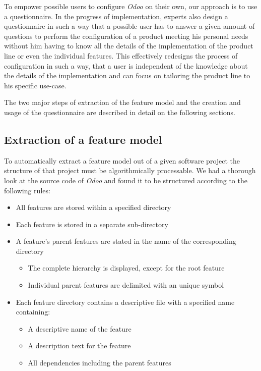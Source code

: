 To empower possible users to configure \textit{Odoo} on their own, our approach is to use a questionnaire. In the progress of implementation, experts also design a questionnaire in such a way that a possible user has to answer a given amount of questions to perform the configuration of a product meeting his personal needs without him having to know all the details of the implementation of the product line or even the individual features. This effectively redesigns the process of configuration in such a way, that a user is independent of the knowledge about the details of the implementation and can focus on tailoring the product line to his specific use-case.

The two major steps of extraction of the feature model and the creation and usage of the questionnaire are described in detail on the following sections.


\subsection{Extraction of a feature model}
To automatically extract a feature model out of a given software project the structure of that project must be algorithmically processable. We had a thorough look at the source code of \textit{Odoo} and found it to be structured according to the following rules:

\begin{itemize}
	\item All features are stored within a specified directory
	\item Each feature is stored in a separate sub-directory
	\item A feature's parent features are stated in the name of the corresponding directory
	\begin{itemize}
		\item The complete hierarchy is displayed, except for the root feature
		\item Individual parent features are delimited with an unique symbol
	\end{itemize}
	\item Each feature directory contains a descriptive file with a specified name containing:
	\begin{itemize}
		\item A descriptive name of the feature
		\item A description text for the feature
		\item All dependencies including the parent features
	\end{itemize}
\end{itemize}

